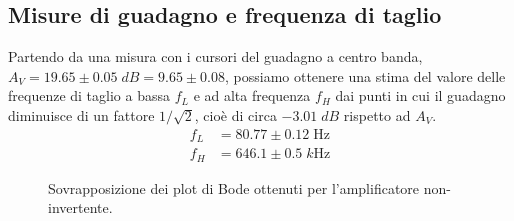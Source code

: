 \documentclass[10pt,a4paper]{article}
\begin{document}
\subsection{Misure di guadagno e frequenza di taglio}
Partendo da una misura con i cursori del guadagno a centro banda,
$A_V = 19.65 \pm 0.05 \; \si{dB} = 9.65 \pm 0.08$, possiamo ottenere una stima del valore
delle frequenze di taglio a bassa $f_L$ e ad alta frequenza $f_H$ dai punti
in cui il guadagno diminuisce di un fattore $1/\sqrt{2}$, cioè di circa
$-3.01 \; \si{dB}$ rispetto ad $A_V$.
\begin{align*}
f_L &= 80.77 \pm 0.12 \; \si{\Hz}\\
f_H &= 646.1 \pm 0.5 \; \si{k\Hz}
\end{align*}

\begin{figure}[htbp]
\centering
\caption{Sovrapposizione dei plot di Bode ottenuti per l'amplificatore
non-invertente. \label{fig: prdbode}}
\end{figure}
\end{document}
